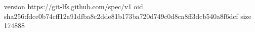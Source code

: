 version https://git-lfs.github.com/spec/v1
oid sha256:fdce0b74cff12a91dfba8c2dde81b173ba720d749c0d8ca8ff3dcb540a8f6dcf
size 174888
